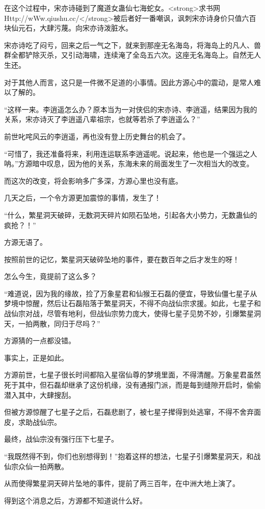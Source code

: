 \begin{this_body}
在这个过程中，宋亦诗碰到了魔道女蛊仙七海蛇女。<strong>求书网Http://wWw.qiushu.cc/</strong>被后者好一番嘲讽，讽刺宋亦诗身价只值六百块仙元石，大肆污蔑。向宋亦诗泼脏水。

宋亦诗吃了闷亏，回来之后一气之下，就来到那座无名海岛，将海岛上的凡人、兽群全都铲除灭杀，又引动海啸，连续淹了全岛五六次。这座无名海岛上。自然无人生还。

对于其他人而言，这只是一件微不足道的小事情。因此方源心中的震动，是常人难以了解的。

“这样一来。李逍遥怎么办？原本当为一对侠侣的宋亦诗、李逍遥，结果因为我的关系，宋亦诗灭了李逍遥八辈祖宗，也就等若杀了李逍遥么？”

前世叱咤风云的李逍遥，再也没有登上历史舞台的机会了。

“可惜了，我还准备将来，利用连运联系李逍遥呢。说起来，他也是一个强运之人呐。”方源暗中叹息，因为他的关系，东海未来的局面发生了一次相当大的改变。

而这次的改变，将会影响多广多深，方源心里也没有底。

几天之后，一个令方源更加震惊的事情，发生了！

“什么，繁星洞天破碎，无数洞天碎片如陨石坠地，引起各大小势力，无数蛊仙的疯抢？！”

方源无语了。

按照前世的记忆，繁星洞天破碎坠地的事件，要在数百年之后才发生的呀！

怎么今生，竟提前了这么多？

“难道说，因为我的缘故，捡了万象星君和仙猴王石磊的便宜，导致仙僵七星子从梦境中惊醒，然后让石磊陷落于繁星洞天，不得不向战仙宗求援。如此，七星子和战仙宗对战，尽管有地利，但战仙宗势力庞大，使得七星子见势不妙，引爆繁星洞天，一拍两散，同归于尽吗？”

方源猜的一点都没错。

事实上，正是如此。

方源前世，七星子很长时间都陷入星宿仙尊的梦境里面，不得清醒。万象星君虽然死于其中，但石磊却继承了这份机缘，没有通报门派，而是每到缝隙开启时，偷偷潜入其中，大肆搜刮。

但被方源惊醒了七星子之后，石磊悲剧了，被七星子撵得到处逃窜，不得不舍弃面皮，求助战仙宗。

最终，战仙宗没有强行压下七星子。

“我既然得不到，你们也别想得到！”抱着这样的想法，七星子引爆繁星洞天，和战仙宗众仙一拍两散。

从而使得繁星洞天碎片坠地的事件，提前了两三百年，在中洲大地上演了。

得到这个消息之后，方源都不知道说什么好。


\end{this_body}
